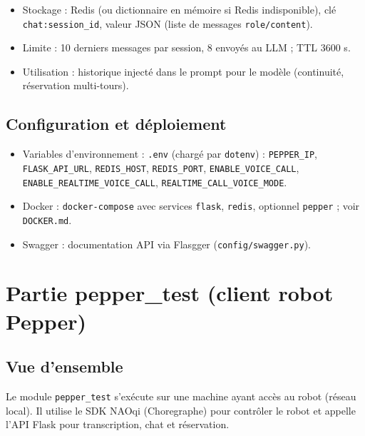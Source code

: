 \documentclass[12pt,a4paper]{article}
\begin{document}
\begin{itemize}[noitemsep]
  \item Stockage : Redis (ou dictionnaire en mémoire si Redis indisponible), clé \texttt{chat:session\_id}, valeur JSON (liste de messages \texttt{role/content}).
  \item Limite : 10 derniers messages par session, 8 envoyés au LLM ; TTL 3600 s.
  \item Utilisation : historique injecté dans le prompt pour le modèle (continuité, réservation multi-tours).
\end{itemize}

\subsection{Configuration et déploiement}

\begin{itemize}[noitemsep]
  \item Variables d'environnement : \texttt{.env} (chargé par \texttt{dotenv}) : \texttt{PEPPER\_IP}, \texttt{FLASK\_API\_URL}, \texttt{REDIS\_HOST}, \texttt{REDIS\_PORT}, \texttt{ENABLE\_VOICE\_CALL}, \texttt{ENABLE\_REALTIME\_VOICE\_CALL}, \texttt{REALTIME\_CALL\_VOICE\_MODE}.
  \item Docker : \texttt{docker-compose} avec services \texttt{flask}, \texttt{redis}, optionnel \texttt{pepper} ; voir \texttt{DOCKER.md}.
  \item Swagger : documentation API via Flasgger (\texttt{config/swagger.py}).
\end{itemize}

\section{Partie pepper\_test (client robot Pepper)}

\subsection{Vue d'ensemble}

Le module \texttt{pepper\_test} s'exécute sur une machine ayant accès au robot (réseau local). Il utilise le SDK NAOqi (Choregraphe) pour contrôler le robot et appelle l'API Flask pour transcription, chat et réservation.
\end{document}
